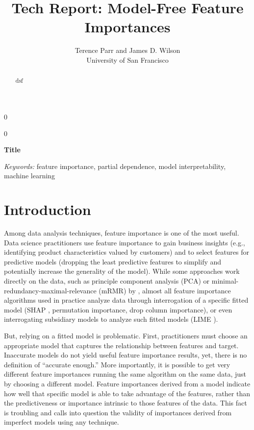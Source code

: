 \documentclass[12pt]{article}
\newcommand{\blind}{0}
\newcommand{\todo}[1]{{{\color{red}{[#1]}}}}
\begin{document}
\def\spacingset#1{\renewcommand{\baselinestretch}%
{#1}\small\normalsize} \spacingset{1}



\blind
{
  \title{\bf Tech Report: Model-Free Feature Importances}

  \author{Terence Parr and James D. Wilson\\
      University of San Francisco\\
}
  \maketitle
} \fi

\blind
{
  \bigskip
  \bigskip
  \bigskip
  \begin{center}
    {\LARGE\bf Title}
\end{center}
  \medskip
} \fi

\bigskip
\begin{abstract}
dsf
\end{abstract}

\noindent%
{\it Keywords:} feature importance, partial dependence, model interpretability, machine learning

\section{Introduction}
\label{sec:intro}

\todo{wrapper vs filter methods}

Among data analysis techniques, feature importance is one of the most  useful. Data science practitioners use feature importance to gain business insights (e.g., identifying product characteristics valued by customers) and to select features for predictive models (dropping the least predictive features to simplify and potentially increase the generality of the model). While some approaches work directly on the data, such as principle component analysis (PCA) or minimal-redundancy-maximal-relevance (mRMR) by \cite{mRMR}, almost all feature importance algorithms used in practice analyze data through interrogation of a specific  fitted model (SHAP \cite{shap}, permutation importance, drop column importance), or even interrogating subsidiary models to analyze such fitted models (LIME \cite{lime}).

But, relying on a fitted model is problematic. First, practitioners must choose an appropriate model that captures the relationship between features and target. Inaccurate models do not yield useful feature importance results, yet, there is no definition of ``accurate enough.'' More importantly, it is possible to get very different feature importances running the same algorithm on the same data, just by choosing a different model. Feature importances derived from a model indicate how well that specific model is able to take advantage of the features, rather than the predictiveness or importance intrinsic to those features of the data.  This fact is troubling and calls into question the validity of importances derived from imperfect models using any technique.  
\end{document}
